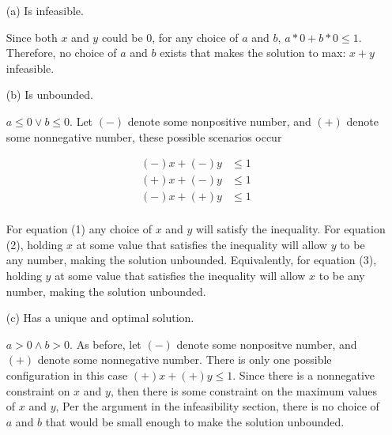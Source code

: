 \documentclass[11pt]{article}
\begin{document}
\begin{itemize}
\item[(a)] Is infeasible.

Since both $x$ and $y$ could be $0$, for any choice of $a$ and $b$, 
$a*0+b*0\leq 1$. Therefore, no choice of $a$ and $b$ exists that makes
the solution to max: $x+y$ infeasible. 

\item[(b)] Is unbounded.

$a\leq 0 \vee b\leq 0$. Let $(-)$ denote some nonpositive number, and $(+)$ 
denote some nonnegative number, these possible scenarios occur


\begin{equation}
  \begin{aligned}
    (-)x + (-)y &\leq 1\\
    (+)x + (-)y &\leq 1\\
    (-)x + (+)y &\leq 1\\
  \end{aligned}
\end{equation}

For equation (1) any choice of $x$ and $y$ will satisfy the inequality.
For equation (2), holding $x$ at some value that satisfies the inequality will
allow $y$ to be any number, making the solution unbounded.
Equivalently, for equation (3), holding $y$ at some value that satisfies the inequality will
allow $x$ to be any number, making the solution unbounded.

\item[(c)] Has a unique and optimal solution.

 $a>0 \wedge b>0$. As before, let $(-)$ denote some nonpositve number, and $(+)$
denote some nonnegative number. There is only one possible configuration in this
case $(+)x + (+)y \leq 1$. Since there is a nonnegative constraint on
$x$ and $y$, then there is some constraint on the maximum values of $x$ and $y$, 
Per the argument in the infeasibility section, there is no choice of $a$ and
$b$ that would be small enough to make the solution unbounded. 

\end{itemize}


 
\label{pg:end-of-p3}

%
\end{document}
